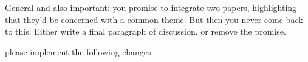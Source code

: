 General and also important: you promise to integrate two papers, highlighting that they’d be concerned with a common theme. But then you never come back to this. Either write a final paragraph of discussion, or remove the promise. 


please implement the following changes









